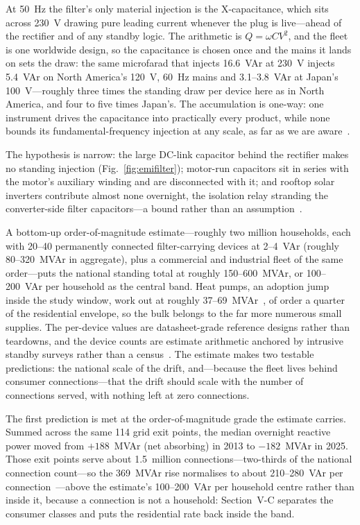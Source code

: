 \documentclass[journal]{IEEEtran}
\begin{document}
At 50~Hz the filter's only material injection is the X-capacitance, which sits
across 230~V drawing pure leading current whenever the plug is live---ahead of
the rectifier and of any standby logic. The arithmetic is $Q=\omega C V^2$, and
the fleet is one worldwide design, so the capacitance is chosen once and the
mains it lands on sets the draw: the same microfarad that injects 16.6~VAr at
230~V injects 5.4~VAr on North America's 120~V, 60~Hz mains and 3.1--3.8~VAr at
Japan's 100~V---roughly three times the standing draw per device here as in North
America, and four to five times Japan's. The accumulation is one-way: one instrument
drives the capacitance into practically every product, while none bounds its
fundamental-frequency injection at any scale, as far as we are aware~\cite{hume_extended}.

The hypothesis is narrow: the large DC-link capacitor
behind the rectifier makes no standing injection (Fig.~\ref{fig:emifilter});
motor-run capacitors sit in series with the motor's auxiliary winding and are
disconnected with it; and rooftop solar inverters contribute almost none
overnight, the isolation relay stranding the converter-side filter capacitors---a bound rather than an assumption~\cite{hume_extended}.

A bottom-up order-of-magnitude estimate---roughly two million households, each
with 20--40 permanently connected filter-carrying devices at 2--4~VAr (roughly
80--320~MVAr in aggregate), plus a commercial and industrial fleet of the same
order---puts the national standing total at roughly 150--600~MVAr, or
100--200~VAr per household as the central band. Heat pumps, an adoption jump
inside the study window, work out at roughly
37--69~MVAr~\cite{hume_extended}, of order a quarter of the
residential envelope, so the bulk belongs to the far more numerous small
supplies. The per-device values are datasheet-grade reference designs rather than
teardowns, and the device counts are estimate arithmetic anchored by intrusive
standby surveys rather than a census~\cite{hume_extended}. The estimate makes
two testable predictions: the national scale of the drift, and---because the
fleet lives behind consumer connections---that the drift should scale with the
number of connections served, with nothing left at zero connections.

The first prediction is met at the order-of-magnitude grade the estimate carries.
Summed across the same 114 grid exit points, the median overnight reactive power
moved from $+188$~MVAr (net absorbing) in 2013 to $-182$~MVAr in 2025. Those exit
points serve about 1.5~million connections---two-thirds of the national connection count---so the 369~MVAr rise normalises to about
210--280~VAr per connection~\cite{hume_extended}---above the estimate's
100--200~VAr per household centre rather than inside it, because a connection is not a household:
Section~V-C separates the consumer classes and puts the residential rate back
inside the band.
\end{document}
